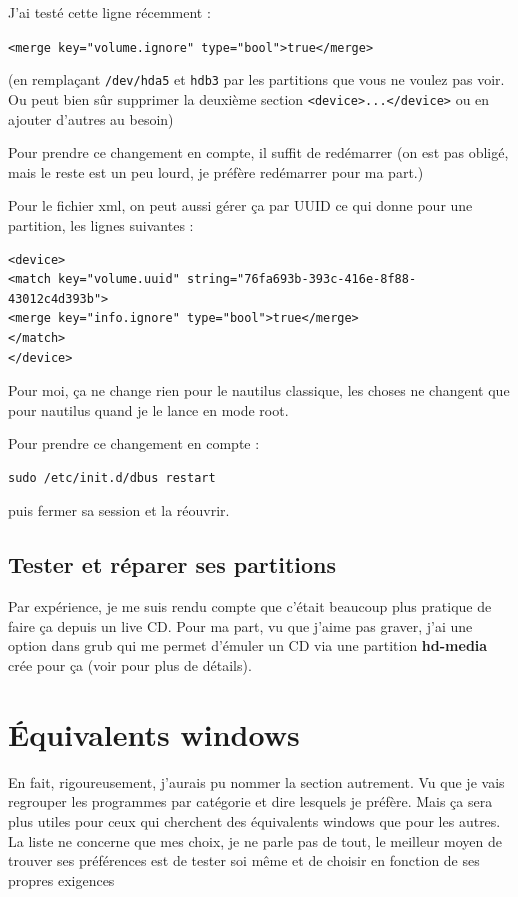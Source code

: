\documentclass[a4paper,twoside]{article}
\begin{document}
\begin{remarque}
J'ai testé cette ligne récemment :

\texttt{<merge key="volume.ignore" type="bool">true</merge>}
\end{remarque}

(en remplaçant \texttt{/dev/hda5} et \texttt{hdb3} par les partitions que vous ne voulez pas voir. Ou peut bien sûr supprimer la deuxième section \texttt{<device>...</device>} ou en ajouter d'autres au besoin)

Pour prendre ce changement en compte, il suffit de redémarrer (on est pas obligé, mais le reste est un peu lourd, je préfère redémarrer pour ma part.)

Pour le fichier xml, on peut aussi gérer ça par UUID ce qui donne pour une partition, les lignes suivantes :
\begin{verbatim}
<device>
<match key="volume.uuid" string="76fa693b-393c-416e-8f88-43012c4d393b">
<merge key="info.ignore" type="bool">true</merge>
</match>
</device>
\end{verbatim}

\begin{remarque}
Pour moi, ça ne change rien pour le nautilus classique, les choses ne changent que pour nautilus quand je le lance en mode root.
\end{remarque}

Pour prendre ce changement en compte :

\begin{verbatim}
sudo /etc/init.d/dbus restart
\end{verbatim}

puis fermer sa session et la réouvrir.

\subsection{Tester et réparer ses partitions}
Par expérience, je me suis rendu compte que c'était beaucoup plus pratique de faire ça depuis un live CD. Pour ma part, vu que j'aime pas graver, j'ai une option dans grub qui me permet d'émuler un CD via une partition \textbf{hd-media} crée pour ça (voir  pour plus de détails).


\section{\'Equivalents windows}
En fait, rigoureusement, j'aurais pu nommer la section autrement. Vu que je vais regrouper les programmes par catégorie et dire lesquels je préfère. Mais ça sera plus utiles pour ceux qui cherchent des équivalents windows que pour les autres.
{\red La liste ne concerne que mes choix, je ne parle pas de tout, le meilleur moyen de trouver ses préférences est de tester soi même et de choisir en fonction de ses propres exigences}
\end{document}
